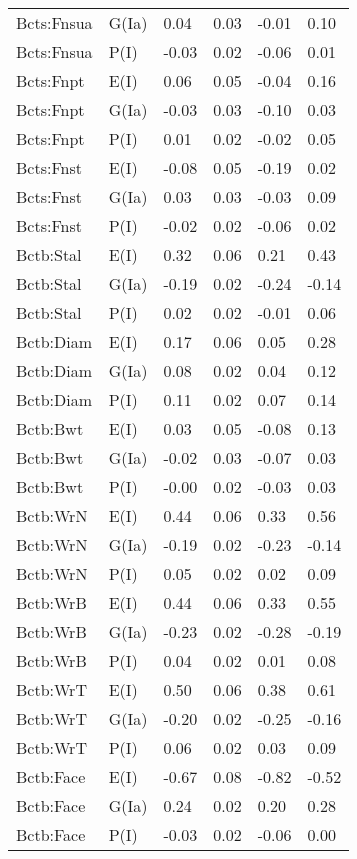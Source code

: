 \begin{center}
\begin{longtable}{|p{1.1in}|p{0.7in}|p{0.7in}|p{0.6in}|p{0.6in}|p{0.6in}|}
  Bcts:Fnsua & G(Ia) & 0.04 & 0.03 & -0.01 & 0.10 \\ 
  Bcts:Fnsua & P(I) & -0.03 & 0.02 & -0.06 & 0.01 \\ 
  Bcts:Fnpt & E(I) & 0.06 & 0.05 & -0.04 & 0.16 \\ 
  Bcts:Fnpt & G(Ia) & -0.03 & 0.03 & -0.10 & 0.03 \\ 
  Bcts:Fnpt & P(I) & 0.01 & 0.02 & -0.02 & 0.05 \\ 
  Bcts:Fnst & E(I) & -0.08 & 0.05 & -0.19 & 0.02 \\ 
  Bcts:Fnst & G(Ia) & 0.03 & 0.03 & -0.03 & 0.09 \\ 
  Bcts:Fnst & P(I) & -0.02 & 0.02 & -0.06 & 0.02 \\ 
  Bctb:Stal & E(I) & 0.32 & 0.06 & 0.21 & 0.43 \\ 
  Bctb:Stal & G(Ia) & -0.19 & 0.02 & -0.24 & -0.14 \\ 
  Bctb:Stal & P(I) & 0.02 & 0.02 & -0.01 & 0.06 \\ 
  Bctb:Diam & E(I) & 0.17 & 0.06 & 0.05 & 0.28 \\ 
  Bctb:Diam & G(Ia) & 0.08 & 0.02 & 0.04 & 0.12 \\ 
  Bctb:Diam & P(I) & 0.11 & 0.02 & 0.07 & 0.14 \\ 
  Bctb:Bwt & E(I) & 0.03 & 0.05 & -0.08 & 0.13 \\ 
  Bctb:Bwt & G(Ia) & -0.02 & 0.03 & -0.07 & 0.03 \\ 
  Bctb:Bwt & P(I) & -0.00 & 0.02 & -0.03 & 0.03 \\ 
  Bctb:WrN & E(I) & 0.44 & 0.06 & 0.33 & 0.56 \\ 
  Bctb:WrN & G(Ia) & -0.19 & 0.02 & -0.23 & -0.14 \\ 
  Bctb:WrN & P(I) & 0.05 & 0.02 & 0.02 & 0.09 \\ 
  Bctb:WrB & E(I) & 0.44 & 0.06 & 0.33 & 0.55 \\ 
  Bctb:WrB & G(Ia) & -0.23 & 0.02 & -0.28 & -0.19 \\ 
  Bctb:WrB & P(I) & 0.04 & 0.02 & 0.01 & 0.08 \\ 
  Bctb:WrT & E(I) & 0.50 & 0.06 & 0.38 & 0.61 \\ 
  Bctb:WrT & G(Ia) & -0.20 & 0.02 & -0.25 & -0.16 \\ 
  Bctb:WrT & P(I) & 0.06 & 0.02 & 0.03 & 0.09 \\ 
  Bctb:Face & E(I) & -0.67 & 0.08 & -0.82 & -0.52 \\ 
  Bctb:Face & G(Ia) & 0.24 & 0.02 & 0.20 & 0.28 \\ 
  Bctb:Face & P(I) & -0.03 & 0.02 & -0.06 & 0.00 \\ 

\end{longtable}
\end{center}

